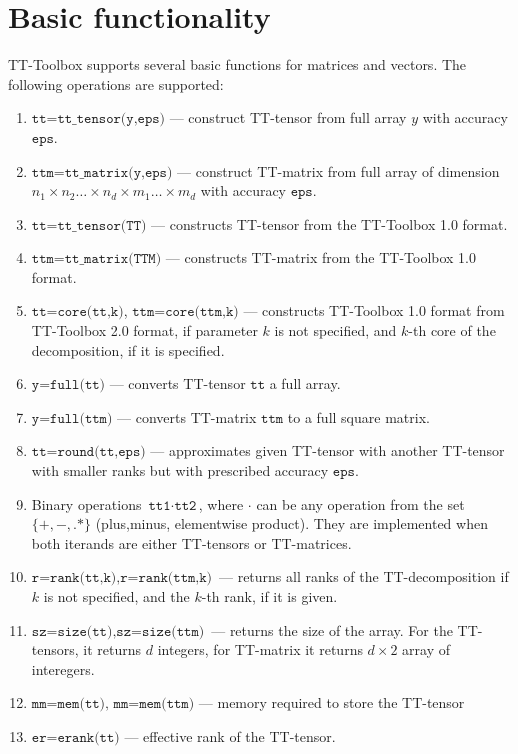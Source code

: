 \documentclass[a4paper,12pt,twoside]{article}
\begin{document}
\section{Basic functionality}
TT-Toolbox supports several basic functions for matrices and vectors.
The following operations are supported:
\begin{enumerate}
\item $\texttt{tt=tt\_tensor(y,eps)}$ --- construct TT-tensor from full array $y$ with accuracy $\texttt{eps}$. 
\item $\texttt{ttm=tt\_matrix(y,eps)}$ --- construct TT-matrix from full array of dimension $n_1 \times n_2 \ldots \times n_d \times m_1 \ldots \times m_d$
with accuracy $\texttt{eps}$. 
\item $\texttt{tt=tt\_tensor(TT)}$ --- constructs TT-tensor from the TT-Toolbox 1.0 format.
\item $\texttt{ttm=tt\_matrix(TTM)}$ --- constructs TT-matrix from the TT-Toolbox 1.0 format.
\item $\texttt{tt=core(tt,k)}$, $\texttt{ttm=core(ttm,k)}$ --- constructs TT-Toolbox 1.0 format from TT-Toolbox 2.0 format, if parameter
$k$ is not specified, and $k$-th core of the decomposition, if it is specified.
\item $\texttt{y=full(tt)}$ --- converts TT-tensor $\texttt{tt}$ a full array.
\item $\texttt{y=full(ttm)}$ --- converts TT-matrix $\texttt{ttm}$ to a full square matrix. 
\item $\texttt{tt=round(tt,eps)}$ --- approximates given TT-tensor with another TT-tensor with smaller ranks but with prescribed accuracy $\texttt{eps}$.
\item Binary operations $\texttt{tt1} \cdot \texttt{tt2}$, where $\cdot$ can be any operation from the set $\{+,-,.*\}$ (plus,minus, elementwise
product). They are implemented when 
both iterands are either TT-tensors or TT-matrices.
\item $\texttt{r=rank(tt,k)}, \texttt{r=rank(ttm,k)}$ --- returns all ranks of the TT-decomposition if $k$ is not specified,
and the $k$-th rank, if it is given.
\item $\texttt{sz=size(tt)}, \texttt{sz=size(ttm)}$ --- returns the size of the array. For the TT-tensors, it returns $d$ integers,
for TT-matrix it returns $d \times 2$ array of interegers. 
\item $\texttt{mm=mem(tt), mm=mem(ttm)}$ --- memory required to store the TT-tensor 
\item $\texttt{er=erank(tt)}$ --- effective rank of the TT-tensor.

\end{enumerate}
\end{document}
